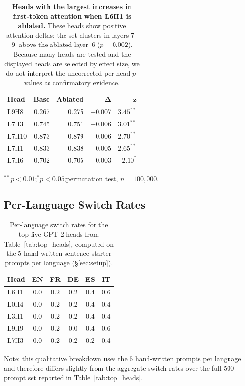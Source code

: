 \documentclass[11pt]{article}
\begin{document}
\begin{table}[H]
\caption{\textbf{Heads with the largest increases in first-token attention
when L6H1 is ablated.} These heads show positive attention deltas; the set
clusters in layers 7--9, above the ablated layer~6 ($p{=}0.002$). Because many
heads are tested and the displayed heads are selected by effect size, we do
not interpret the uncorrected per-head $p$-values as confirmatory evidence.}
\label{tab:compensatory}
\centering\small
\begin{tabular}{lrrrr}
\toprule
\textbf{Head} & \textbf{Base} & \textbf{Ablated} & $\boldsymbol{\Delta}$ & $\boldsymbol{z}$ \\
\midrule
L9H8  & 0.267 & 0.275 & $+$0.007 & $3.45^{**}$ \\
L7H3  & 0.745 & 0.751 & $+$0.006 & $3.01^{**}$ \\
L7H10 & 0.873 & 0.879 & $+$0.006 & $2.70^{**}$ \\
L7H1  & 0.833 & 0.838 & $+$0.005 & $2.65^{**}$ \\
L7H6  & 0.702 & 0.705 & $+$0.003 & $2.10^{*}$  \\
\bottomrule
\end{tabular}
\smallskip

{\footnotesize $^{**}p{<}0.01$;\enspace$^{*}p{<}0.05$;\enspace permutation test, $n{=}100{,}000$.}
\end{table}

\subsection{Per-Language Switch Rates}
\label{app:perlang}

\begin{table}[H]
\caption{Per-language switch rates for the top five GPT-2 heads from
Table~\ref{tab:top_heads}, computed on the 5 hand-written
sentence-starter prompts per language (\S\ref{sec:setup}).}
\label{tab:per_language_app}
\centering\small
\begin{tabular}{lccccc}
\toprule
\textbf{Head} & \textbf{EN} & \textbf{FR} & \textbf{DE} & \textbf{ES} & \textbf{IT} \\
\midrule
L6H1  & 0.0 & 0.2 & 0.2 & 0.4 & 0.6 \\
L0H4  & 0.0 & 0.2 & 0.2 & 0.4 & 0.4 \\
L3H1  & 0.0 & 0.2 & 0.2 & 0.4 & 0.4 \\
L9H9  & 0.0 & 0.2 & 0.0 & 0.4 & 0.6 \\
L7H3  & 0.0 & 0.2 & 0.2 & 0.2 & 0.4 \\
\bottomrule
\end{tabular}
\smallskip

{\footnotesize Note: this qualitative breakdown uses the 5 hand-written
prompts per language and therefore differs slightly from the aggregate
switch rates over the full 500-prompt set reported in
Table~\ref{tab:top_heads}.}
\end{table}
\end{document}
